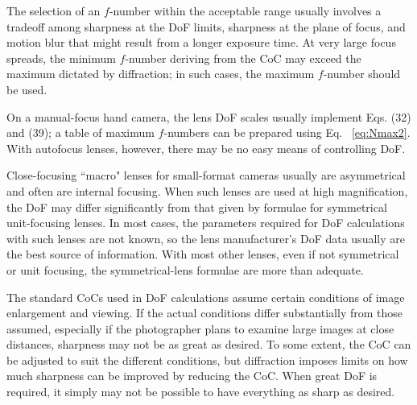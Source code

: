 \documentclass[11pt, oneside]{scrartcl}   	%
\begin{document}
The selection of an $f$-number within the acceptable range usually involves a tradeoff among sharpness at the DoF limits, sharpness at the plane of focus, and motion blur that might result from a longer exposure time. At very large focus spreads, the minimum $f$-number
deriving from the CoC may exceed the maximum dictated by diffraction; in such cases, the maximum $f$-number should be used.

On a manual-focus hand camera, the lens DoF scales usually implement Eqs. (32) and (39); a table of maximum $f$-numbers can be prepared using Eq. ~\ref{eq:Nmax2}. With autofocus lenses, however, there may be no easy means of controlling DoF.

Close-focusing ``macro" lenses for small-format cameras usually are asymmetrical and often are internal focusing. When such lenses are used at high magnification, the DoF may differ significantly from that given by formulae for symmetrical unit-focusing lenses. In most cases, the parameters required for DoF calculations with such lenses are not known, so the lens manufacturer’s DoF data usually are the best source of information. With most other lenses, even if not symmetrical or unit focusing, the symmetrical-lens formulae are more than adequate.

The standard CoCs used in DoF calculations assume certain conditions of image enlargement and viewing. If the actual conditions differ substantially from those assumed, especially if the photographer plans to examine large images at close distances, sharpness may not be as great as desired. To some extent, the CoC can be adjusted to suit the different conditions, but diffraction imposes limits on how much sharpness can be improved by reducing the CoC. When great DoF is required, it simply may not be possible to have everything as sharp as desired.
\end{document}
